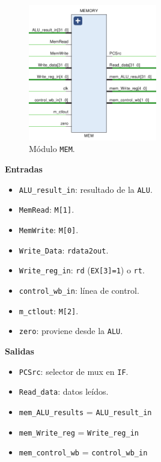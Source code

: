 \documentclass[a4paper]{article}
\begin{document}
\begin{figure}[H]
	\begin{center}				
	\includegraphics[width=0.5\textwidth,center]{TP4_14.png}
  	\caption{Módulo \texttt{MEM}.}
  	\label{fig:funcionamiento.}
  	\end{center}
\end{figure}

\textbf{Entradas}
\begin{itemize}
	\item \texttt{ALU\_result\_in}: resultado de la \texttt{ALU}.
	\item \texttt{MemRead}: \texttt{M[1]}.
	\item \texttt{MemWrite}: \texttt{M[0]}.
	\item \texttt{Write\_Data}: \texttt{rdata2out}.
	\item \texttt{Write\_reg\_in}: \texttt{rd} (\texttt{EX[3]=1}) o \texttt{rt}.
	\item \texttt{control\_wb\_in}: línea de control.
	\item \texttt{m\_ctlout}: \texttt{M[2]}.
	\item \texttt{zero}: proviene desde la \texttt{ALU}.
\end{itemize}

\textbf{Salidas}
\begin{itemize}
	\item \texttt{PCSrc}: selector de mux en \texttt{IF}.
	\item \texttt{Read\_data}: datos leídos.
	\item \texttt{mem\_ALU\_results} = \texttt{ALU\_result\_in}
	\item \texttt{mem\_Write\_reg} = \texttt{Write\_reg\_in}
	\item \texttt{mem\_control\_wb} = \texttt{control\_wb\_in}
\end{itemize}
\end{document}
